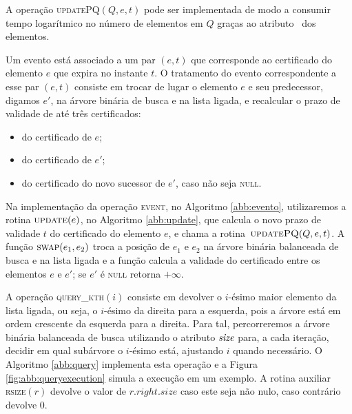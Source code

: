 A operação \textsc{updatePQ}$(Q,e,t)$ pode ser implementada de modo
a consumir tempo logarítmico no número de elementos em $Q$ graças ao
atributo \pqpos~dos elementos.

Um evento está associado a um par $(e, t)$ que corresponde ao
certificado do elemento $e$ que expira no instante $t$. O tratamento
do evento correspondente a esse par $(e, t)$ consiste em trocar de
lugar o elemento $e$ e seu predecessor, digamos $e'$, na árvore
binária de busca e na lista ligada, e recalcular o prazo de validade
de até três certificados:

\begin{itemize}
    \item do certificado de $e$;
    \item do certificado de $e'$;
    \item do certificado do novo sucessor de $e'$, caso não seja \textsc{null}.
\end{itemize}

Na implementação da operação \textsc{event}, no Algoritmo
\ref{abb:evento}, utilizaremos a rotina $\textsc{update}(e)$, no
Algoritmo \ref{abb:update}, que calcula o novo prazo de validade $t$
do certificado do elemento $e$, e chama a
rotina~$\textsc{updatePQ}(Q, e, t)$. A função $\textsc{swap}(e_1,
e_2)$ troca a posição de $e_1$ e $e_2$ na árvore binária balanceada
de busca e na lista ligada e a função  calcula
a validade do certificado entre os elementos $e$ e $e'$; se $e'$ é
\textsc{null} retorna $+\infty$.









A operação \textsc{query\_kth}$(i)$ consiste em devolver o $i$-ésimo
maior elemento da lista ligada, ou seja, o $i$-ésimo da direita para
a esquerda, pois a árvore está em ordem crescente da esquerda para a
direita. Para tal, percorreremos a árvore binária balanceada de
busca utilizando o atributo $\textit{size}$ para, a cada iteração,
decidir em qual subárvore o $i$-ésimo está, ajustando $i$ quando
necessário. O Algoritmo \ref{abb:query} implementa esta operação e a
Figura \ref{fig:abb:queryexecution} simula a execução em um exemplo.
A rotina auxiliar \textsc{rsize}$(r)$ devolve o valor de
$r.right.\textit{size}$ caso este seja não nulo, caso contrário
devolve $0$.


